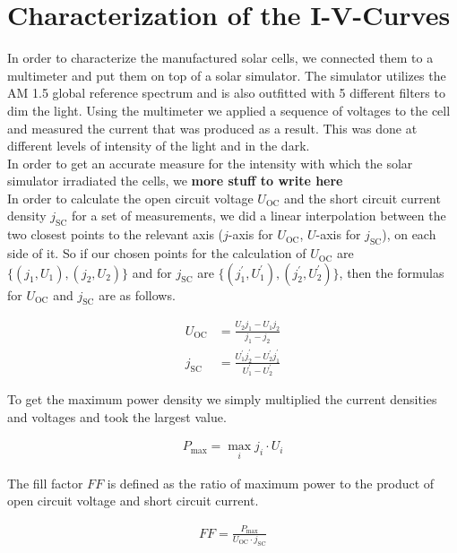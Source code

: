 
\newcommand{\Uoc}{U_{\text{OC}}}
\newcommand{\jsc}{j_{\text{SC}}}
\newcommand{\Pmax}{P_{\text{max}}}
\newcommand{\meann}[1]{\langle #1 \rangle_n}

\section{Characterization of the I-V-Curves}\label{sec:charac}

In order to characterize the manufactured solar cells, we connected them to a multimeter and put them on top of a solar simulator. The simulator utilizes the AM 1.5 global reference spectrum and is also outfitted with 5 different filters to dim the light. Using the multimeter we applied a sequence of voltages to the cell and measured the current that was produced as a result. This was done at different levels of intensity of the light and in the dark.\\
In order to get an accurate measure for the intensity with which the solar simulator irradiated the cells, we \textbf{more stuff to write here}\\
In order to calculate the open circuit voltage $\Uoc$ and the short circuit current density $\jsc$ for a set of measurements, we did a linear interpolation between the two closest points to the relevant axis ($j$-axis for $\Uoc$, $U$-axis for $\jsc$), on each side of it. So if our chosen points for the calculation of $\Uoc$ are $\{(j_1,U_1),(j_2,U_2)\}$ and for $\jsc$ are $\{(j_1^\prime,U_1^\prime),(j_2^\prime,U_2^\prime)\}$, then the formulas for $\Uoc$ and $\jsc$ are as follows.

\begin{align}
\Uoc &= \frac{U_2 j_1 - U_1 j_2}{j_1-j_2}\\
\jsc &= \frac{U_1^\prime j_2^\prime - U_2^\prime j_1^\prime}{U_1^\prime-U_2^\prime}
\end{align}

To get the maximum power density we simply multiplied the current densities and voltages and took the largest value.

\begin{align}
\Pmax = \max_{i} j_i\cdot U_i
\end{align}

The fill factor $FF$ is defined as the ratio of maximum power to the product of open circuit voltage and short circuit current.

\begin{align}
FF = \frac{\Pmax}{\Uoc \cdot \jsc}
\end{align}

